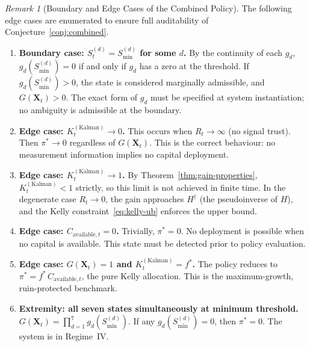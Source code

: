 \documentclass[12pt,openany]{book}
\numberwithin{equation}{chapter}
\theoremstyle{plain}
\theoremstyle{definition}
\theoremstyle{remark}
\newtheorem{remark}[theorem]{Remark}
\def\mathcal#1{#1}%
\begin{document}
\begin{remark}[Boundary and Edge Cases of the Combined Policy]
\label{rem:combined-boundary}
The following edge cases are enumerated to ensure full
auditability of Conjecture~\ref{conj:combined}.

\begin{enumerate}
  \item \textbf{Boundary case: $\mathcal{S}_t^{(d)} =
        \mathcal{S}_{\min}^{(d)}$ for some $d$.}
        By the continuity of each $g_d$,
        $g_d(\mathcal{S}_{\min}^{(d)}) = 0$ if and only
        if $g_d$ has a zero at the threshold.  If
        $g_d(\mathcal{S}_{\min}^{(d)}) > 0$, the state
        is considered marginally admissible, and
        $G(\mathbf{X}_t) > 0$.  The exact form of $g_d$
        must be specified at system instantiation; no
        ambiguity is admissible at the boundary.

  \item \textbf{Edge case: $K_t^{(\mathrm{Kalman})} \to 0$.}
        This occurs when $R_t \to \infty$ (no signal trust).
        Then $\pi^* \to 0$ regardless of $G(\mathbf{X}_t)$.
        This is the correct behaviour: no measurement
        information implies no capital deployment.

  \item \textbf{Edge case: $K_t^{(\mathrm{Kalman})} \to 1$.}
        By Theorem~\ref{thm:gain-properties},
        $K_t^{(\mathrm{Kalman})} < 1$ strictly, so this
        limit is not achieved in finite time.  In the
        degenerate case $R_t \to 0$, the gain approaches
        $H^\dagger$ (the pseudoinverse of $H$), and the
        Kelly constraint~\eqref{eq:kelly-ub} enforces the
        upper bound.

  \item \textbf{Edge case: $C_{\mathrm{available},t} = 0$.}
        Trivially, $\pi^* = 0$.  No deployment is possible
        when no capital is available.  This state must be
        detected prior to policy evaluation.

  \item \textbf{Edge case: $G(\mathbf{X}_t) = 1$
        and $K_t^{(\mathrm{Kalman})} = f^*$.}
        The policy reduces to
        $\pi^* = f^*\,C_{\mathrm{available},t}$,
        the pure Kelly allocation.  This is the
        maximum-growth, ruin-protected benchmark.

  \item \textbf{Extremity: all seven states simultaneously
        at minimum threshold.}
        $G(\mathbf{X}_t) = \prod_{d=1}^{7}
        g_d(\mathcal{S}_{\min}^{(d)})$.  If any
        $g_d(\mathcal{S}_{\min}^{(d)}) = 0$, then
        $\pi^* = 0$.  The system is in Regime~IV.


\end{enumerate}
\end{remark}
\end{document}

